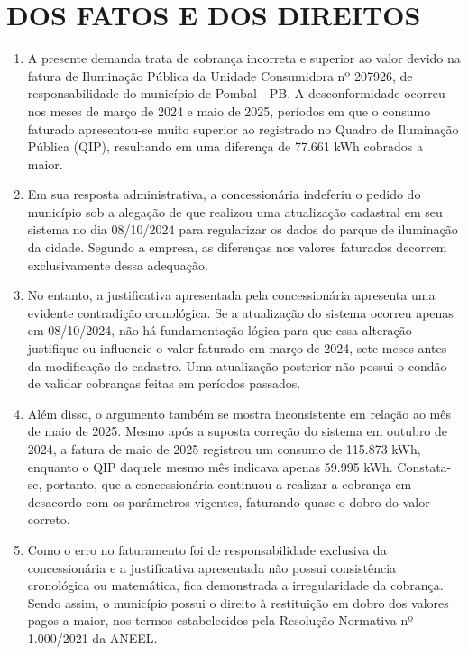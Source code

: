 
\newcommand{\tipoRequerimento}{Contestação de indeferimento de reclamação, faturamento incorreto de iluminação pública}

\section{DOS FATOS E DOS DIREITOS}

\begin{enumerate}[resume]
\item A presente demanda trata de cobrança incorreta e superior ao valor devido na fatura de Iluminação Pública da Unidade Consumidora nº 207926, de responsabilidade do município de Pombal - PB. A desconformidade ocorreu nos meses de março de 2024 e maio de 2025, períodos em que o consumo faturado apresentou-se muito superior ao registrado no Quadro de Iluminação Pública (QIP), resultando em uma diferença de 77.661 kWh cobrados a maior.
\item Em sua resposta administrativa, a concessionária indeferiu o pedido do município sob a alegação de que realizou uma atualização cadastral em seu sistema no dia 08/10/2024 para regularizar os dados do parque de iluminação da cidade. Segundo a empresa, as diferenças nos valores faturados decorrem exclusivamente dessa adequação.
\item No entanto, a justificativa apresentada pela concessionária apresenta uma evidente contradição cronológica. Se a atualização do sistema ocorreu apenas em 08/10/2024, não há fundamentação lógica para que essa alteração justifique ou influencie o valor faturado em março de 2024, sete meses antes da modificação do cadastro. Uma atualização posterior não possui o condão de validar cobranças feitas em períodos passados.
\item Além disso, o argumento também se mostra inconsistente em relação ao mês de maio de 2025. Mesmo após a suposta correção do sistema em outubro de 2024, a fatura de maio de 2025 registrou um consumo de 115.873 kWh, enquanto o QIP daquele mesmo mês indicava apenas 59.995 kWh. Constata-se, portanto, que a concessionária continuou a realizar a cobrança em desacordo com os parâmetros vigentes, faturando quase o dobro do valor correto.
\item Como o erro no faturamento foi de responsabilidade exclusiva da concessionária e a justificativa apresentada não possui consistência cronológica ou matemática, fica demonstrada a irregularidade da cobrança. Sendo assim, o município possui o direito à restituição em dobro dos valores pagos a maior, nos termos estabelecidos pela Resolução Normativa nº 1.000/2021 da ANEEL.
\end{enumerate}

